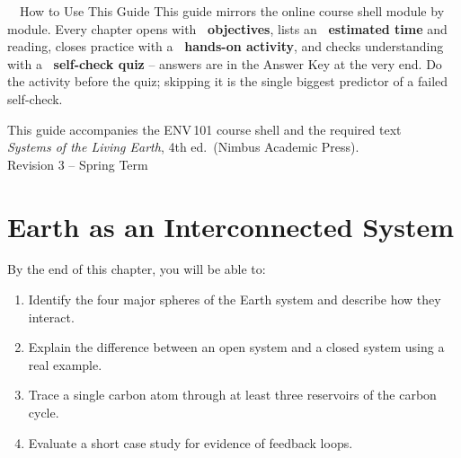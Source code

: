 \documentclass[11pt,a4paper]{scrreprt}
\begin{document}
\begin{titlepage}
\vspace{10pt}
\begin{center}
\begin{minipage}{0.78\textwidth}
\begin{infobox}{\faLightbulb\ \ How to Use This Guide}
\small
This guide mirrors the online course shell module by module. Every chapter opens with
\textbf{\faBullseye\ objectives}, lists an \textbf{\faClock\ estimated time} and reading, closes
practice with a \textbf{\faPen\ hands-on activity}, and checks understanding with a
\textbf{\faQuestionCircle\ self-check quiz} -- answers are in the Answer Key at the very end.
Do the activity before the quiz; skipping it is the single biggest predictor of a failed
self-check.
\end{infobox}
\end{minipage}
\end{center}

\vfill
\begin{center}
{\small\color{inkgray} This guide accompanies the ENV\,101 course shell and the required text\\
\emph{Systems of the Living Earth}, 4th ed.\ (Nimbus Academic Press).}\\[6pt]
{\small\color{inkgray} Revision 3 -- Spring Term}
\end{center}
\end{titlepage}

\chapter{Earth as an Interconnected System}

\begin{objectivesbox}
By the end of this chapter, you will be able to:
\begin{enumerate}[label=\arabic*.]
  \item Identify the four major spheres of the Earth system and describe how they interact.
  \item Explain the difference between an open system and a closed system using a real example.
  \item Trace a single carbon atom through at least three reservoirs of the carbon cycle.
  \item Evaluate a short case study for evidence of feedback loops.
\end{enumerate}
\end{objectivesbox}
\end{document}
